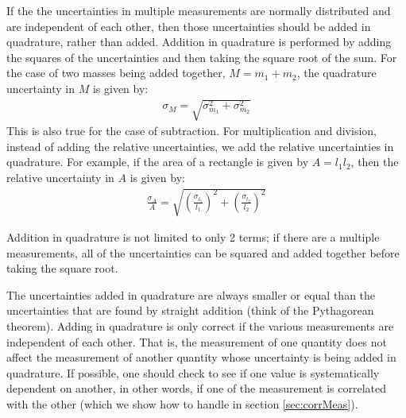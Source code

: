 If the the uncertainties in multiple measurements are normally distributed and are independent of each other, then those uncertainties should be added in quadrature, rather than added. Addition in quadrature is performed by adding the squares of the uncertainties and then taking the square root of the sum. For the case of two masses being added together, $M=m_1+m_2$, the quadrature uncertainty in $M$ is given by:
\begin{align}
\sigma_{M} = \sqrt{\sigma_{m_1}^2+\sigma_{m_2}^2}
\end{align}
This is also true for the case of subtraction. For multiplication and division, instead of adding the relative uncertainties, we add the relative uncertainties in quadrature. For example, if the area of a rectangle is given by $A=l_1l_2$, then the relative uncertainty in $A$ is given by:
\begin{align}
\frac{\sigma_{A}}{A}=\sqrt{\left(\frac{\sigma_{l_1}}{l_1}\right)^2+\left(\frac{\sigma_{l_2}}{l_2}\right)^2}
\end{align}

Addition in quadrature is not limited to only 2 terms; if there are a multiple measurements, all of the uncertainties can be squared and added together before taking the square root.

The uncertainties added in quadrature are always smaller or equal than the uncertainties that are found by straight addition (think of the Pythagorean theorem). Adding in quadrature is only correct if the various measurements are independent of each other. That is, the measurement of one quantity does not affect the measurement of another quantity whose uncertainty is being added in quadrature. If possible, one should check to see if one value is systematically dependent on another, in other words, if one of the measurement is correlated with the other (which we show how to handle in section \ref{sec:corrMeas}).


